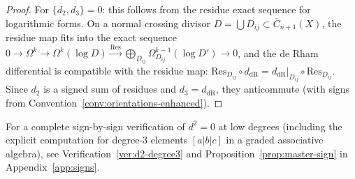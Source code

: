 \begin{proof}
For $\{d_2, d_3\} = 0$: this follows from the residue exact sequence for logarithmic forms. On a normal crossing divisor $D = \bigcup D_{ij} \subset \overline{C}_{n+1}(X)$, the residue map fits into the exact sequence $0 \to \Omega^k \to \Omega^k(\log D) \xrightarrow{\text{Res}} \bigoplus_{D_{ij}} \Omega^{k-1}_{D_{ij}}(\log D') \to 0$, and the de Rham differential is compatible with the residue map: $\text{Res}_{D_{ij}} \circ d_{\text{dR}} = d_{\text{dR}}|_{D_{ij}} \circ \text{Res}_{D_{ij}}$. Since $d_2$ is a signed sum of residues and $d_3 = d_{\text{dR}}$, they anticommute (with signs from Convention~\ref{conv:orientations-enhanced}).
\end{proof}

\begin{remark}\label{rem:sign-bridge}
For a complete sign-by-sign verification of $d^2 = 0$ at low degrees
(including the explicit computation for degree-3 elements $[a|b|c]$ in a
graded associative algebra), see Verification~\ref{ver:d2-degree3} and
Proposition~\ref{prop:master-sign} in Appendix~\ref{app:signs}.
\end{remark}

